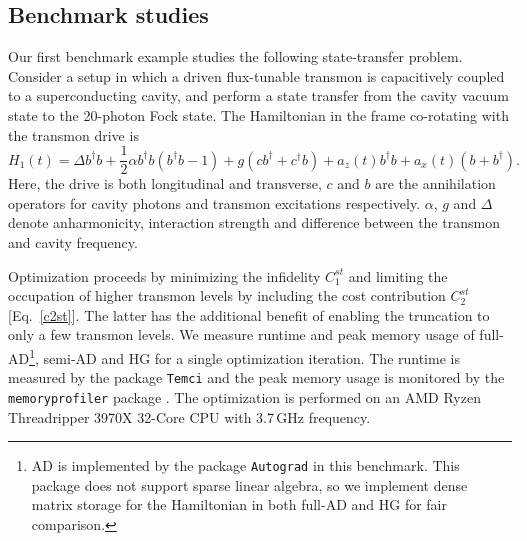 \documentclass[letterpaper,10pt]{iopart}
\begin{document}
\subsection{Benchmark studies}
Our first benchmark example studies the following state-transfer problem. Consider a setup in which a driven flux-tunable transmon is capacitively coupled to a superconducting cavity, and perform a state transfer from the cavity vacuum state to the 20-photon Fock state. The Hamiltonian in the frame co-rotating with the transmon drive is
\begin{equation}
\label{fockH}
    H_1(t)=\Delta b^\dagger b+\frac{1}{2}\alpha b^\dagger b(b^\dagger b-1)+g(cb^\dagger+c^\dagger b)+a_{z}(t)b^\dagger b
    +a_{x}(t)(b+b^\dagger).
\end{equation}
Here, the drive is both longitudinal and transverse,  $c$ and $b$ are the annihilation operators for cavity photons and transmon excitations respectively. $\alpha$, $g$ and $\Delta$ denote anharmonicity, interaction strength and difference between the transmon and cavity frequency. 
 
Optimization proceeds by minimizing the infidelity $C_1^{st}$ and limiting the occupation of higher transmon levels by including the cost contribution $C_2^{st}$ [Eq.\ \eqref{c2st}]. The latter has the additional benefit of enabling the truncation to only a few transmon levels. We measure runtime and peak memory usage of full-AD\footnote{AD is implemented by the package \texttt{Autograd} \cite{maclaurin2015autograd} in this benchmark. This package does not support sparse linear algebra, so we implement dense matrix storage for the Hamiltonian in both full-AD and HG for fair comparison.}, semi-AD and HG for a single optimization iteration. The runtime is measured by the package \texttt{Temci} \cite{temci} and
the peak memory usage is monitored by the \texttt{memory\textunderscore profiler} package \cite{memory}. The optimization is performed on an AMD Ryzen Threadripper 3970X 32-Core CPU with 3.7\,GHz frequency. 
\end{document}
